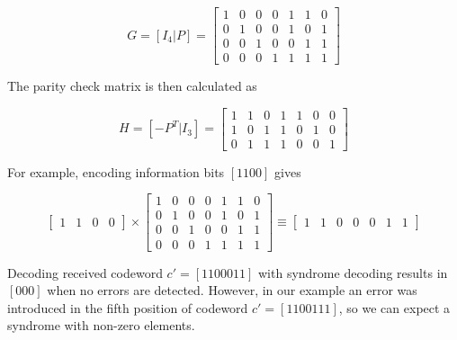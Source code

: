 \documentclass[../main.tex]{subfiles}
\begin{document}
    \begin{equation*}
        G=[I_4|P]=
        \begin{bmatrix}
            1&0&0&0&1&1&0\\
            0&1&0&0&1&0&1\\
            0&0&1&0&0&1&1\\
            0&0&0&1&1&1&1
        \end{bmatrix}
    \end{equation*}

    \noindent
    The parity check matrix is then calculated as

    \begin{equation*}
        H=[-P^T|I_3]=
        \begin{bmatrix}
            1&1&0&1&1&0&0\\
            1&0&1&1&0&1&0\\
            0&1&1&1&0&0&1
        \end{bmatrix}
    \end{equation*}

    \noindent
    For example, encoding information bits $[1 1 0 0]$ gives

    \begin{equation*}
        \begin{bmatrix}
            1&1&0&0
        \end{bmatrix}
        \times
        \begin{bmatrix}
            1&0&0&0&1&1&0\\
            0&1&0&0&1&0&1\\
            0&0&1&0&0&1&1\\
            0&0&0&1&1&1&1
        \end{bmatrix}
        \equiv
        \begin{bmatrix}
            1&1&0&0&0&1&1
        \end{bmatrix}
    \end{equation*}

    \noindent
    Decoding received codeword $c'=[1100011]$ with syndrome decoding results in $[000]$ when no errors are detected. However, in our example an error was introduced in the fifth position of codeword $c'=[1100111]$, so we can expect a syndrome with non-zero elements.
\end{document}
